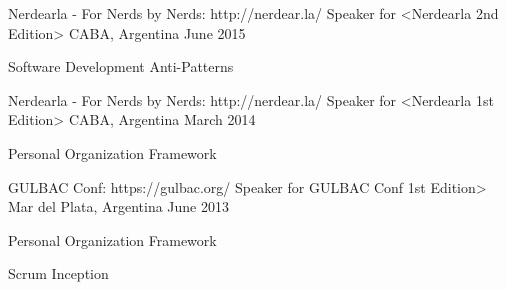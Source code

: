 \begin{cventries}
  \cventry
    {Nerdearla - For Nerds by Nerds: http://nerdear.la/}
    {Speaker for <Nerdearla 2nd Edition>}
    {CABA, Argentina}
    {June 2015}
    {
      \begin{cvitems}
        \item {Software Development Anti-Patterns}
      \end{cvitems}
    }

  \cventry
    {Nerdearla - For Nerds by Nerds: http://nerdear.la/}
    {Speaker for <Nerdearla 1st Edition>}
    {CABA, Argentina}
    {March 2014}
    {
      \begin{cvitems}
        \item {Personal Organization Framework}
      \end{cvitems}
    }

  \cventry
    {GULBAC Conf: https://gulbac.org/}
    {Speaker for GULBAC Conf 1st Edition>}
    {Mar del Plata, Argentina}
    {June 2013}
    {
      \begin{cvitems}
        \item {Personal Organization Framework}
        \item {Scrum Inception}
      \end{cvitems}
    }
\end{cventries}
